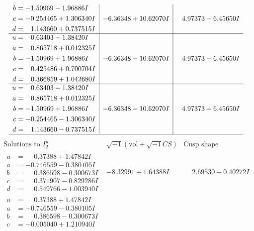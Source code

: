 \documentclass[1p]{elsarticle_modified}
\theoremstyle{definition}
\newcommand{\I}{\sqrt{-1}}
\begin{document}
$$\begin{array}{c|c|c}
\begin{aligned}
b &= -1.50969 - 1.96886 I \\
c &= -0.254465 + 1.306340 I \\
d &= \phantom{-}1.143660 + 0.737515 I\end{aligned}
 & -6.36348 + 10.62070 I & \phantom{-}4.97373 - 6.45650 I \\ \hline\begin{aligned}
u &= \phantom{-}0.63403 - 1.38420 I \\
a &= \phantom{-}0.865718 + 0.012325 I \\
b &= -1.50969 + 1.96886 I \\
c &= \phantom{-}0.425486 + 0.700704 I \\
d &= \phantom{-}0.366859 + 1.042680 I\end{aligned}
 & -6.36348 - 10.62070 I & \phantom{-}4.97373 + 6.45650 I \\ \hline\begin{aligned}
u &= \phantom{-}0.63403 - 1.38420 I \\
a &= \phantom{-}0.865718 + 0.012325 I \\
b &= -1.50969 + 1.96886 I \\
c &= -0.254465 - 1.306340 I \\
d &= \phantom{-}1.143660 - 0.737515 I\end{aligned}
 & -6.36348 - 10.62070 I & \phantom{-}4.97373 + 6.45650 I\\
 \hline 
 \end{array}$$\newpage$$\begin{array}{c|c|c}  
\text{Solutions to }I^u_{2}& \I (\text{vol} + \sqrt{-1}CS) & \text{Cusp shape}\\
 \hline 
\begin{aligned}
u &= \phantom{-}0.37388 + 1.47842 I \\
a &= -0.746559 - 0.380105 I \\
b &= \phantom{-}0.386598 - 0.300673 I \\
c &= \phantom{-}0.371907 - 0.829286 I \\
d &= \phantom{-}0.549766 - 1.003940 I\end{aligned}
 & -8.32991 + 1.64388 I & \phantom{-}2.69530 - 0.40272 I \\ \hline\begin{aligned}
u &= \phantom{-}0.37388 + 1.47842 I \\
a &= -0.746559 - 0.380105 I \\
b &= \phantom{-}0.386598 - 0.300673 I \\
c &= -0.005040 + 1.210940 I \\

\end{aligned}
\end{array}$$
\end{document}
